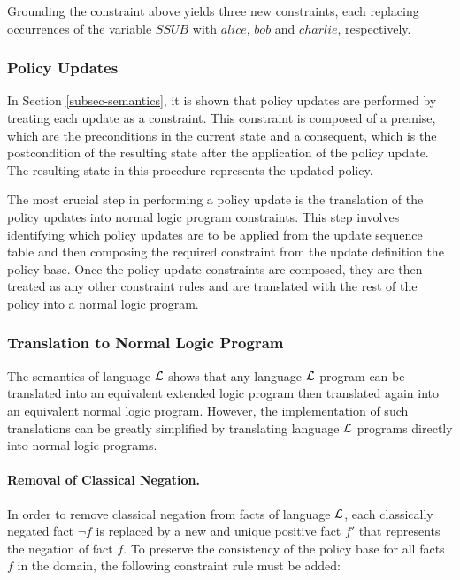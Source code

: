 \documentclass[11pt, twocolumn]{article}
\begin{document}
        Grounding the constraint above yields three new constraints, each
        replacing occurrences of the variable $SSUB$ with $alice$, $bob$ and
        $charlie$, respectively.

      \subsubsection{Policy Updates}

        In Section \ref{subsec-semantics}, it is shown that policy updates are
        performed by treating each update as a constraint. This constraint is
        composed of a premise, which are the preconditions in the current state
        and a consequent, which is the postcondition of the resulting state
        after the application of the policy update. The resulting state in this
        procedure represents the updated policy.

        The most crucial step in performing a policy update is the translation
        of the policy updates into normal logic program constraints. This step
        involves identifying which policy updates are to be applied from the
        update sequence table and then composing the required constraint from
        the update definition the policy base. Once the policy update
        constraints are composed, they are then treated as any other
        constraint rules and are translated with the rest of the policy into
        a normal logic program.

      \subsubsection{Translation to Normal Logic Program}

        The semantics of language ${\cal L}$ shows that any language
        ${\cal L}$ program can be translated into an equivalent extended logic
        program then translated again into an equivalent normal logic program.
        However, the implementation of such translations can be greatly
        simplified by translating language ${\cal L}$ programs directly into
        normal logic programs.

        \paragraph{Removal of Classical Negation.}

          In order to remove classical negation from facts of language
          ${\cal L}$, each classically negated fact $\lnot$$f$ is replaced by
          a new and unique positive fact $f'$ that represents the negation of
          fact $f$. To preserve the consistency of the policy base for all
          facts $f$ in the domain, the following constraint rule must be added:
\end{document}
